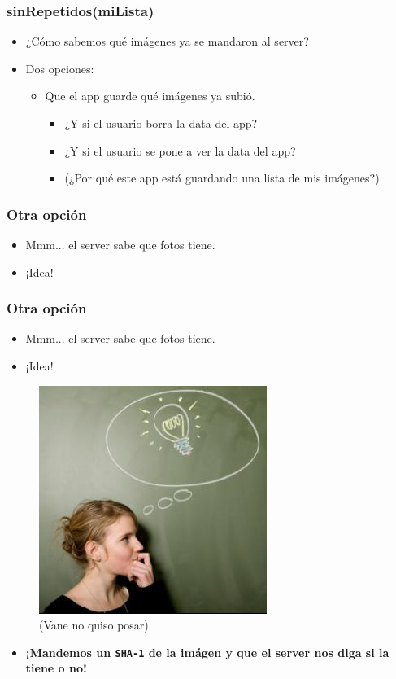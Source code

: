 \documentclass[ignorenonframetext,]{beamer}
\begin{document}
\begin{frame}\frametitle{sinRepetidos(miLista)}
	\begin{itemize}
		\item ¿Cómo sabemos qué imágenes ya se mandaron al server?
		\item Dos opciones:
		\begin{itemize}[<+->]
			\item Que el app guarde qué imágenes ya subió.
			\begin{itemize}[<+->]
				\item ¿Y si el usuario borra la data del app?
				\item ¿Y si el usuario se pone a ver la data del app?
				\item (¿Por qué este app está guardando una lista de mis imágenes?)
			\end{itemize}
		\end{itemize}
	\end{itemize}
\end{frame}

\begin{frame}\frametitle{Otra opción}
	\begin{itemize}[<+->]
		\item Mmm... el server sabe que fotos tiene.
		\item ¡Idea!
	\end{itemize}
\end{frame}

\begin{frame}\frametitle{Otra opción}
	\begin{itemize}
		\item Mmm... el server sabe que fotos tiene.
		\item ¡Idea!
	\end{itemize}
	\begin{figure}[htbp]
		\centering
		\includegraphics[scale=0.23]{idea.jpg}
		\caption*{(Vane no quiso posar)}
	\end{figure}
	\begin{itemize}[<+->]
		\item \textbf{¡Mandemos un \texttt{SHA-1} de la imágen y que el server nos diga si la tiene o no!}
	\end{itemize}
\end{frame}
\end{document}
